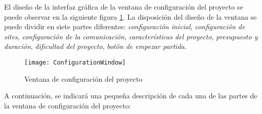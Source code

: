 El diseño de la interfaz gráfica de la ventana de configuración del proyecto se puede observar en la siguiente figura \ref{fig:ConfigurationWindow}. La disposición del diseño de la ventana se puede dividir en siete partes diferentes: \emph{configuración inicial}, \emph{configuración de sites}, \emph{configuración de la comunicación}, \emph{características del proyecto}, \emph{presupuesto y duración}, \emph{dificultad del proyecto}, \emph{botón de empezar partida}.

\begin{figure}[htb]
	\centering
	\texttt{[image: ConfigurationWindow]}
	\caption[Diseño de la ventana de configuración de un proyecto global]{Ventana de configuración del proyecto}
	\label{fig:ConfigurationWindow}
\end{figure}

A continuación, se indicará una pequeña descripción de cada una de las partes de la ventana de configuración del proyecto:

